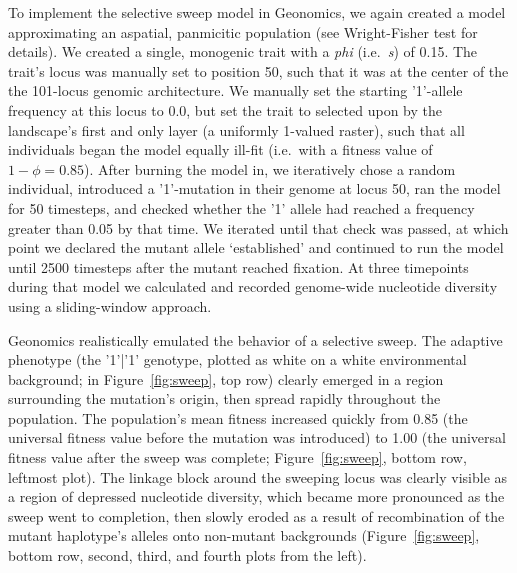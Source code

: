 ﻿\documentclass{article}
\begin{document}
To implement the selective sweep model in Geonomics, we again created a model
approximating an aspatial, panmicitic population (see Wright-Fisher test for details).
We created a single, monogenic trait with a \emph{phi} (i.e.\ \emph{s}) of 0.15.
The trait's locus was manually set to position 50,
such that it was at the center of the the 101-locus genomic architecture.
We manually set the starting '1'-allele frequency at this locus to 0.0,
but set the trait to selected upon by the landscape's first and only layer
(a uniformly 1-valued raster), such that all individuals began the model
equally ill-fit (i.e.\ with a fitness value of $1 - \phi = 0.85$).
After burning the model in, we iteratively chose a random individual,
introduced a '1'-mutation in their genome at locus 50, ran the model for 50 timesteps,
and checked whether the '1' allele had reached a frequency greater than 0.05 by that time.
We iterated until that check was passed, at which point we declared the mutant allele
`established' and continued to run the model until 2500 timesteps
after the mutant reached fixation.
At three timepoints during that model we calculated and recorded
genome-wide nucleotide diversity using a sliding-window approach.

Geonomics realistically emulated the behavior of a selective sweep.
The adaptive phenotype (the '1'|'1' genotype, plotted as white
on a white environmental background; in Figure~\ref{fig:sweep}, top row)
clearly emerged in a region surrounding the mutation's origin,
then spread rapidly throughout the population.
The population's mean fitness increased quickly from 0.85
(the universal fitness value before the mutation was introduced) to 1.00
(the universal fitness value after the sweep was complete; Figure~\ref{fig:sweep}, bottom row, leftmost plot).
The linkage block around the sweeping locus was clearly visible
as a region of depressed nucleotide diversity, which became more pronounced
as the sweep went to completion, then slowly eroded as a result of recombination
of the mutant haplotype's alleles onto non-mutant backgrounds
(Figure~\ref{fig:sweep}, bottom row, second, third, and fourth plots from the left).
\end{document}
